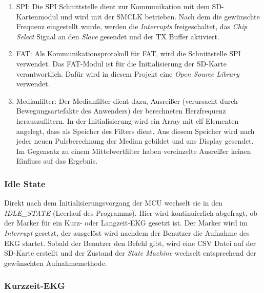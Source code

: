 \begin{enumerate}
    \item SPI: Die SPI Schnittstelle dient zur Kommunikation mit dem SD-Kartenmodul und wird mit der SMCLK betrieben. Nach dem die gewünschte Frequenz eingestellt wurde, werden die \textit{Interrupts} freigeschaltet, das \textit{Chip Select} Signal an den \textit{Slave} gesendet und der TX Buffer aktiviert.
    \item FAT: Als Kommunikationsprotokoll für FAT, wird die Schnittstelle SPI verwendet. Das FAT-Modul ist für die Initialisierung der SD-Karte verantwortlich. Dafür wird in diesem Projekt eine \textit{Open Source Library} verwendet.
    \item Medianfilter: Der Medianfilter dient dazu, Ausreißer (verursacht durch Bewegungsartefakte des Anwenders) der berechneten Herzfrequenz herauszufiltern. In der Initialisierung wird ein Array mit elf Elementen angelegt, dass als Speicher des Filters dient. Aus diesem Speicher wird nach jeder neuen Pulsberechnung der Median gebildet und ans Display gesendet. Im Gegensatz zu einem Mittelwertfilter haben vereinzelte Ausreißer keinen Einfluss auf das Ergebnis.
\end{enumerate}

\subsubsection{Idle State}

Direkt nach dem Initialisierungsvorgang der MCU wechselt sie in den \textit{IDLE\_STATE} (Leerlauf des Programms). 
Hier wird kontinuierlich abgefragt, ob der Marker für ein Kurz- oder Langzeit-EKG gesetzt ist. Der Marker wird im \textit{Interrupt} gesetzt, der ausgelöst wird nachdem der Benutzer die Aufnahme des EKG startet.
Sobald der Benutzer den Befehl gibt, wird eine CSV Datei auf der SD-Karte erstellt und der Zustand der \textit{State Machine} wechselt entsprechend der gewünschten Aufnahmemethode.

\subsubsection{Kurzzeit-EKG}

